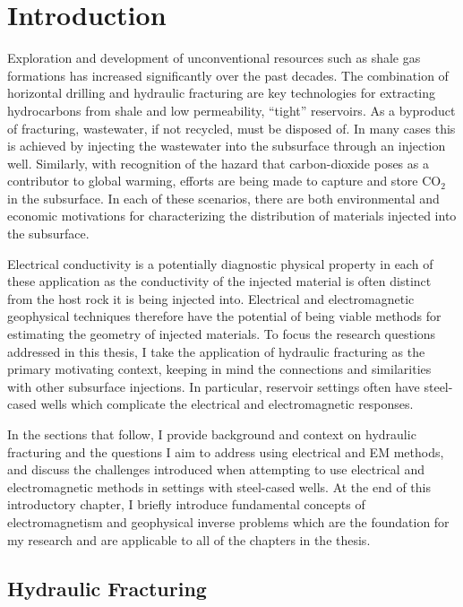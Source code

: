 
\chapter{Introduction}
\label{ch:introduction}

Exploration and development of unconventional resources such as shale gas formations has increased significantly over the past decades. The combination of horizontal drilling and hydraulic fracturing are key technologies for extracting hydrocarbons from shale and low permeability, ``tight'' reservoirs. As a byproduct of fracturing, wastewater, if not recycled, must be disposed of. In many cases this is achieved by injecting the wastewater into the subsurface through an injection well. Similarly, with recognition of the hazard that carbon-dioxide poses as a contributor to global warming, efforts are being made to capture and store CO$_2$ in the subsurface. In each of these scenarios, there are both environmental and economic motivations for characterizing the distribution of materials injected into the subsurface.

Electrical conductivity is a potentially diagnostic physical property in each of these application as the conductivity of the injected material is often distinct from the host rock it is being injected into. Electrical and electromagnetic geophysical techniques therefore have the potential of being viable methods for estimating the geometry of injected materials. To focus the research questions addressed in this thesis, I take the application of hydraulic fracturing as the primary motivating context, keeping in mind the connections and similarities with other subsurface injections. In particular, reservoir settings often have steel-cased wells which complicate the electrical and electromagnetic responses.

In the sections that follow, I provide background and context on hydraulic fracturing and the questions I aim to address using electrical and EM methods, and discuss the challenges introduced when attempting to use electrical and electromagnetic methods in settings with steel-cased wells. At the end of this introductory chapter, I briefly introduce fundamental concepts of electromagnetism and geophysical inverse problems which are the foundation for my research and are applicable to all of the chapters in the thesis.
\section{Hydraulic Fracturing}
\label{sec:hydraulic-fracturing}

